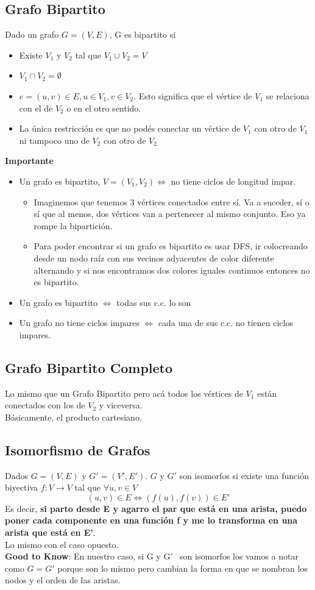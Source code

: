 \documentclass[10pt,a4paper]{article}
\begin{document}
\subsection*{Grafo Bipartito}
Dado un grafo $G = (V, E)$, G es bipartito si
\begin{itemize}
    \item Existe $V_{1}$ y $V_{2}$ tal que $V_{1} \cup V_{2} = V$
    \item $V_{1} \cap V_{2} = \emptyset$
    \item $e = (u,v) \in E, u \in V_{1}, v \in V_{2}$. Esto significa que el vértice de $V_{1}$ se relaciona con el de $V_{2}$ o en el otro sentido. 
    \item La única restricción es que no podés conectar un vértice de $V_{1}$ con otro de $V_{1}$ ni tampoco uno de $V_{2}$ con otro de $V_{2}$
\end{itemize}
\textbf{Importante}
\begin{itemize}
    \item Un grafo es bipartito, $V = (V_{1}, V_{2}) \iff$ no tiene ciclos de longitud impar.
    \begin{itemize}
        \item Imaginemos que tenemos 3 vértices conectados entre sí. Va a suceder, sí o sí que al menos, dos vértices van a pertenecer al mismo conjunto. Eso ya rompe la bipartición. 
        \item Para poder encontrar si un grafo es bipartito es usar DFS, ir colocreando desde un nodo raíz con sus vecinos adyacentes de color diferente alternando y si nos encontramos dos colores iguales continuos entonces no es bipartito.
    \end{itemize}
    \item Un grafo es bipartito $\iff$ todas sus c.c. lo son 
    \item Un grafo no tiene ciclos impares $\iff$ cada una de sus c.c. no tienen ciclos impares.
\end{itemize}
\subsection*{Grafo Bipartito Completo}
Lo mismo que un Grafo Bipartito pero acá todos los vértices de $V_{1}$ están conectados con los de $V_{2}$ y viceversa. \\
Básicamente, el producto cartesiano.
\subsection*{Isomorfismo de Grafos}
Dados  $G = (V, E)$ y $G' = (V', E')$. $G$ y $G'$ son isomorfos si existe una función biyectiva $f: V \rightarrow V$ tal que $\forall u,v \in V$ 
\[(u,v) \in E \iff (f(u), f(v)) \in E'\]
Es decir, \textbf{si parto desde E y agarro el par que está en una arista, puedo poner cada componente en una función f y me lo transforma en una arista que está en E'}. \\
Lo mismo con el caso opuesto. \\
\textbf{Good to Know}: En nuestro caso, si G y G' \ son isomorfos los vamos a notar como $G = G'$ porque son lo mismo pero cambian la forma en que se nombran los nodos y el orden de las aristas.
\end{document}
